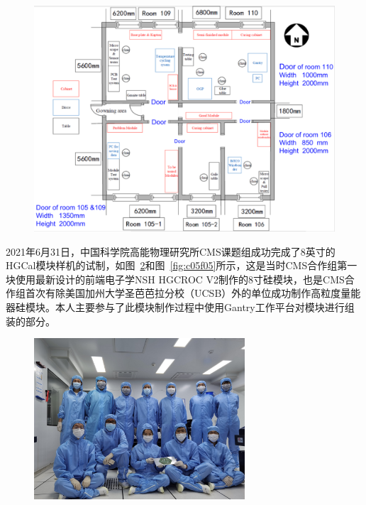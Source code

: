 \begin{figure}[!htbp]
    \centering
    \includegraphics[width=1.0\textwidth]{figures/chapter05/HGClab.png}
    \label{fig:c05f03}
\end{figure}

2021年6月31日，中国科学院高能物理研究所CMS课题组成功完成了8英寸的HGCal模块样机的试制，如图~\ref{fig:c05f04}和图~\ref{fig:c05f05}所示，这是当时CMS合作组第一块使用最新设计的前端电子学NSH HGCROC V2制作的8寸硅模块，也是CMS合作组首次有除美国加州大学圣芭芭拉分校（UCSB）外的单位成功制作高粒度量能器硅模块。本人主要参与了此模块制作过程中使用Gantry工作平台对模块进行组装的部分。

\begin{figure}[!htbp]
    \centering
    \includegraphics[width=0.7\textwidth]{figures/chapter05/HGCal_group.jpeg}
    \label{fig:c05f04}
\end{figure}

